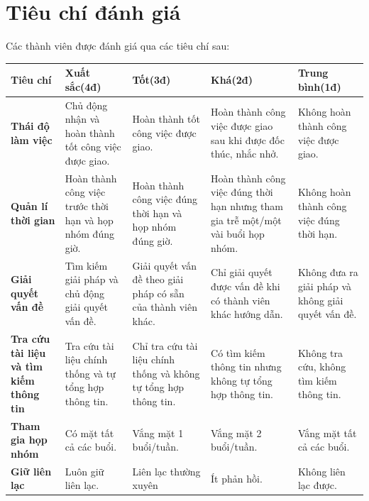 \documentclass[../main-report.tex]{subfiles}
\begin{document}
\section{Tiêu chí đánh giá}
Các thành viên được đánh giá qua các tiêu chí sau:

\begin{table}[ht!]
\centering
\begin{tabular}{|>{\centering\arraybackslash}p{1.5cm}|>{\centering\arraybackslash}p{3cm}|>{\centering\arraybackslash}p{3cm}|>{\centering\arraybackslash}p{3cm}|>{\centering\arraybackslash}p{3cm}|}
\hline 
\textbf{Tiêu chí} & \textbf{Xuất sắc(4đ)} & \textbf{Tốt(3đ)} & \textbf{Khá(2đ)} & \textbf{Trung bình(1đ)} \\ 
\hline 
\textbf{Thái độ làm việc} & Chủ động nhận và hoàn thành tốt công việc được giao. & Hoàn thành tốt công việc được giao. & Hoàn thành công việc được giao sau khi được đốc thúc, nhắc nhở. & Không hoàn thành công việc được giao.\\ 
\hline 
\textbf{Quản lí thời gian} & Hoàn thành công việc trước thời hạn và họp nhóm đúng giờ. & Hoàn thành công việc đúng thời hạn và họp nhóm đúng giờ. & Hoàn thành công việc đúng thời hạn nhưng tham gia trễ một/một vài buổi họp nhóm. & Không hoàn thành công việc đúng thời hạn. \\ 
\hline 
\textbf{Giải quyết vấn đề} & Tìm kiếm giải pháp và chủ động giải quyết vấn đề. & Giải quyết vấn đề theo giải pháp có sẵn của thành viên khác. & Chỉ giải quyết được vấn đề khi có thành viên khác hướng dẫn. & Không đưa ra giải pháp và không giải quyết vấn đề. \\ 
\hline 
\textbf{Tra cứu tài liệu và tìm kiếm thông tin} & Tra cứu tài liệu
chính thống và tự tổng hợp thông tin. & Chỉ tra cứu tài liệu chính thống và không tự tổng hợp thông tin. & Có tìm kiếm thông tin nhưng không tự tổng hợp thông tin. & Không tra cứu, không tìm kiếm thông tin. \\ 
\hline 
\textbf{Tham gia họp nhóm} & Có mặt tất cả các buổi. & Vắng mặt
1 buổi/tuần. & Vắng mặt 2 buổi/tuần. & Vắng mặt tất cả các buổi. \\ 
\hline 
\textbf{Giữ liên lạc} & Luôn giữ liên lạc. & Liên lạc thường xuyên & Ít phản hồi. & Không liên lạc được. \\ 
\hline
\end{tabular}
\end{table}

\vspace{5cm}
\end{document}
